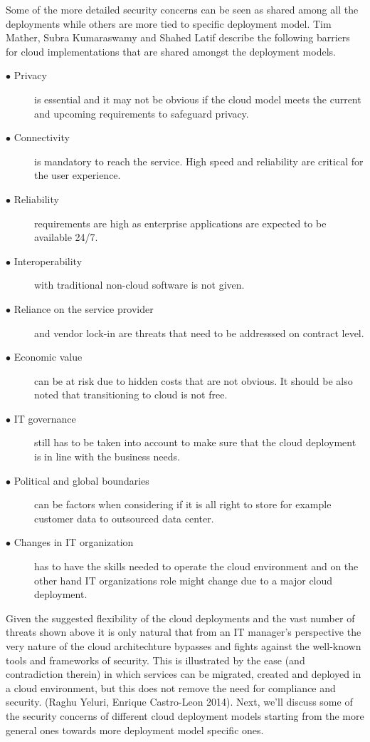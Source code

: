 \documentclass{article}
\begin{document}
Some of the more detailed security concerns can be seen as shared among all the deployments while others are more tied to specific deployment model.
Tim Mather, Subra Kumaraswamy and Shahed Latif describe the following barriers for cloud implementations that are shared amongst the deployment models.
\begin{description}
        \item[$\bullet$ Privacy] is essential and it may not be obvious if the cloud model meets the current and upcoming requirements to safeguard privacy.
        \item[$\bullet$ Connectivity] is mandatory to reach the service. High speed and reliability are critical for the user experience.
        \item[$\bullet$ Reliability] requirements are high as enterprise applications are expected to be available 24/7.
        \item[$\bullet$ Interoperability] with traditional non-cloud software is not given.
        \item[$\bullet$ Reliance on the service provider] and vendor lock-in are threats that need to be addresssed on contract level.
        \item[$\bullet$ Economic value] can be at risk due to hidden costs that are not obvious. It should be also noted that transitioning to cloud is not free.
        \item[$\bullet$ IT governance] still has to be taken into account to make sure that the cloud deployment is in line with the business needs.
        \item[$\bullet$ Political and global boundaries] can be factors when considering if it is all right to store for example customer data to outsourced data center.
        \item[$\bullet$ Changes in IT organization] has to have the skills needed to operate the cloud environment and on the other hand IT organizations role might change due to a major cloud deployment.
\end{description}
Given the suggested flexibility of the cloud deployments and the vast number of threats shown above it is only natural that from an IT manager's perspective the very nature of the cloud architechture bypasses and fights against the well-known tools and frameworks of security.
This is illustrated by the ease (and contradiction therein) in which services can be migrated, created and deployed in a cloud environment, but this does not remove the need for compliance and security. (Raghu Yeluri, Enrique Castro-Leon 2014). 
Next, we'll discuss some of the security concerns of different cloud deployment models starting from the more general ones towards more deployment model specific ones.
\end{document}
